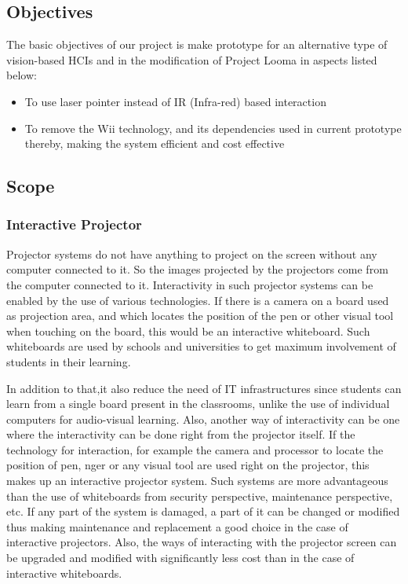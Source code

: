 \documentclass[12pt, a4paper]{article}
\begin{document}
\subsection{Objectives}
The basic objectives of our project is make prototype for an alternative type of vision-based HCIs and in the modification of Project Looma in aspects listed below:
\begin{itemize}
	\item To use laser pointer instead of IR (Infra-red) based interaction
	\item To remove the Wii technology, and its dependencies used in current prototype thereby, making the system efficient and cost effective
\end{itemize}

\subsection{Scope}
\subsubsection{Interactive Projector}
Projector systems do not have anything to project on the screen without
any computer connected to it. So the images projected by the projectors
come from the computer connected to it. Interactivity in such projector
systems can be enabled by the use of various technologies. If there is a camera
on a board used as projection area, and which locates the position of the pen
or other visual tool when touching on the board, this would be an interactive
whiteboard. Such whiteboards are used by schools and universities to get
maximum involvement of students in their learning. 

In addition to that,it also reduce the need of IT infrastructures since students can learn from a
single board present in the classrooms, unlike the use of individual computers
for audio-visual learning. Also, another way of interactivity can be one where
the interactivity can be done right from the projector itself. If the technology
for interaction, for example the camera and processor to locate the position
of pen, nger or any visual tool are used right on the projector, this makes up
an interactive projector system. Such systems are more advantageous than
the use of whiteboards from security perspective, maintenance perspective,
etc. If any part of the system is damaged, a part of it can be changed
or modified thus making maintenance and replacement a good choice in the
case of interactive projectors. Also, the ways of interacting with the projector
screen can be upgraded and modified with significantly less cost than in the
case of interactive whiteboards. 
\end{document}
